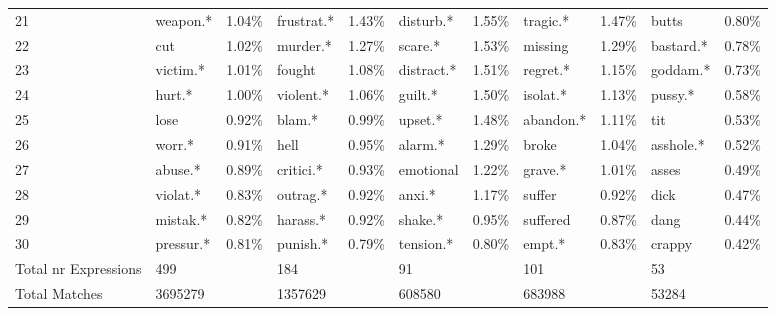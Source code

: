 \begin{table}[h]
\begin{adjustbox}{width=\linewidth, center}
\begin{tabular}{lllllllllll}
	21                   &         weapon.* &     1.04\% &         frustrat.* &           1.43\% &    disturb.* &     1.55\% &      tragic.* &     1.47\% &            butts &            0.80\% \\
	22                   &              cut &     1.02\% &           murder.* &           1.27\% &      scare.* &     1.53\% &       missing &     1.29\% &        bastard.* &            0.78\% \\
	23                   &         victim.* &     1.01\% &             fought &           1.08\% &   distract.* &     1.51\% &      regret.* &     1.15\% &         goddam.* &            0.73\% \\
	24                   &           hurt.* &     1.00\% &          violent.* &           1.06\% &      guilt.* &     1.50\% &      isolat.* &     1.13\% &          pussy.* &            0.58\% \\
	25                   &             lose &     0.92\% &             blam.* &           0.99\% &      upset.* &     1.48\% &     abandon.* &     1.11\% &              tit &            0.53\% \\
	26                   &           worr.* &     0.91\% &               hell &           0.95\% &      alarm.* &     1.29\% &         broke &     1.04\% &        asshole.* &            0.52\% \\
	27                   &          abuse.* &     0.89\% &          critici.* &           0.93\% &    emotional &     1.22\% &       grave.* &     1.01\% &            asses &            0.49\% \\
	28                   &         violat.* &     0.83\% &           outrag.* &           0.92\% &       anxi.* &     1.17\% &        suffer &     0.92\% &             dick &            0.47\% \\
	29                   &         mistak.* &     0.82\% &           harass.* &           0.92\% &      shake.* &     0.95\% &      suffered &     0.87\% &             dang &            0.44\% \\
	30                   &        pressur.* &     0.81\% &           punish.* &           0.79\% &    tension.* &     0.80\% &        empt.* &     0.83\% &           crappy &            0.42\% \\
	Total nr Expressions &              499 &            &                184 &                  &           91 &            &           101 &            &               53 &                   \\
	Total Matches        &          3695279 &            &            1357629 &                  &       608580 &            &        683988 &            &            53284 &                   \\
	\bottomrule
	\end{tabular}
	
\end{adjustbox}
	\end{table}

